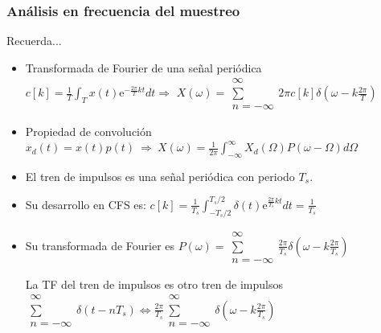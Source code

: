 \begin{frame}\frametitle{Análisis en frecuencia del muestreo}
  \begin{block}{Recuerda...}
    \begin{itemize}
      \item Transformada de Fourier de una señal periódica\\[0.5ex]
    $c[k]=\frac{1}{T}\int_T x(t)\mathrm{e}^{-\frac{2\pi}{T} k t}dt \Rightarrow$
    $X(\omega)=\substack{\infty\\\sum\\n=-\infty} 2\pi c[k]\delta(\omega- k \frac{2\pi}{T})$
    \item Propiedad de convolución\\[0.5ex]
    $x_d(t)=x(t)p(t)~\Rightarrow~X(\omega)=\frac{1}{2\pi}\int_{-\infty}^{\infty}{X_d(\Omega)P(\omega - \Omega)}d\Omega$
    \end{itemize}
  \end{block}

  \begin{itemize}
    \item El tren de impulsos es una señal periódica con periodo $T_s$.
    \item Su desarrollo en CFS es: $c[k]=\frac{1}{T_s}\int_{-T_s/2}^{T_s/2}\delta(t)\mathrm{e}^{\frac{2\pi}{T_s} k t}dt=\frac{1}{T_s}$
    \item Su transformada de Fourier es \color{blue}$P(\omega)=\substack{\infty\\\sum\\n=-\infty}\frac{2\pi}{T_s}\delta(\omega- k \frac{2\pi}{T_s})$\color{black}
  \begin{alertblock}{La TF del tren de impulsos es otro tren de impulsos}\centering
    $\substack{\infty\\\sum\\n=-\infty}\delta(t - n T_s) \Leftrightarrow
    \frac{2\pi}{T_s}\substack{\infty\\\sum\\n=-\infty}\delta(\omega- k \frac{2\pi}{T_s})$
  \end{alertblock}
  \end{itemize}
\end{frame}

